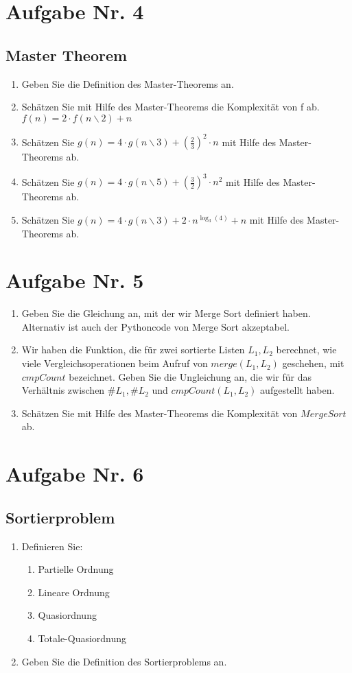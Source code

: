 \documentclass[12px,a4paper]{article}
\begin{document}
\section*{Aufgabe Nr. 4}
\subsection*{Master Theorem}
\begin{enumerate}
	\item Geben Sie die Definition des Master-Theorems an.
	\item Schätzen Sie mit Hilfe des Master-Theorems die Komplexität von f ab. \\
	\noindent\hspace*{0.5mm} $f(n) = 2 \cdot f(n\backslash 2) + n$
	\item Schätzen Sie $g(n) = 4 \cdot g(n\backslash 3) + ( \frac{2}{3} ) ^2 \cdot n$ mit Hilfe des Master-Theorems ab.
	\item Schätzen Sie $g(n) = 4 \cdot g(n\backslash 5) + ( \frac{3}{2} ) ^3 \cdot n^2$ mit Hilfe des Master-Theorems ab.
	\item Schätzen Sie $g(n) = 4 \cdot g(n\backslash 3) + 2 \cdot n^{\log_3(4)} + n$ mit Hilfe des Master-Theorems ab.
\end{enumerate}
\newpage
\section*{Aufgabe Nr. 5}
\begin{enumerate}
	\item Geben Sie die Gleichung an, mit der wir Merge Sort definiert haben. Alternativ ist auch der Pythoncode von Merge Sort akzeptabel.
	\item Wir haben die Funktion, die für zwei sortierte Listen $L_1, L_2$ berechnet, wie viele Vergleichsoperationen beim Aufruf von $merge(L_1, L_2)$ geschehen, mit $cmpCount$ bezeichnet. Geben Sie die Ungleichung an, die wir für das Verhältnis zwischen $\#L_1, \#L_2$ und $cmpCount(L_1, L_2)$ aufgestellt haben. 
	\item Schätzen Sie mit Hilfe des Master-Theorems die Komplexität von $Merge Sort$ ab.
\end{enumerate}
\newpage
\section*{Aufgabe Nr. 6}
\subsection*{Sortierproblem}
\begin{enumerate}
	\item Definieren Sie:	
	\begin{enumerate} 
	\item Partielle Ordnung
	\item Lineare Ordnung
	\item Quasiordnung
	\item Totale-Quasiordnung
	\end{enumerate}
	
	\item Geben Sie die Definition des Sortierproblems an.
\end{enumerate}
\newpage
\end{document}
